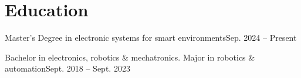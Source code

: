 \section{Education}

\begin{edulist}

    {Master's Degree in electronic systems for smart environments}{Sep. 2024 -- Present}

    {Bachelor in electronics, robotics \& mechatronics. Major in robotics \& automation}{Sept. 2018 -- Sept. 2023}

\end{edulist}
